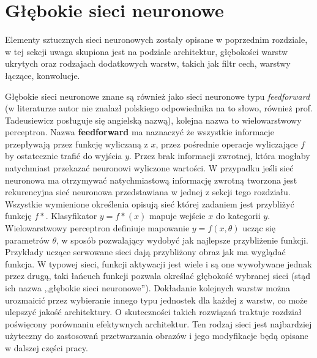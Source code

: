 \documentclass[12pt,a4paper,twoside,titlepage,openright]{book}
\begin{document}
\section{Głębokie sieci neuronowe}
Elementy sztucznych sieci neuronowych zostały opisane w poprzednim rozdziale, w tej sekcji uwaga skupiona jest na podziale architektur, głębokości warstw ukrytych oraz rodzajach dodatkowych warstw, takich jak filtr cech, warstwy łączące, konwolucje.

Głębokie sieci neuronowe znane są również jako sieci neuronowe typu \textit{feedforward} (w literaturze autor nie znalazł polskiego odpowiednika na to słowo, również prof. Tadeusiewicz posługuje się angielską nazwą), kolejna nazwa to wielowarstwowy perceptron. Nazwa \textbf{feedforward} ma naznaczyć że wszystkie informacje przepływają przez funkcję wyliczaną z \(x\), przez pośrednie operacje wyliczające \(f\) by ostatecznie trafić do wyjścia \(y\). Przez brak informacji zwrotnej, która mogłaby natychmiast przekazać neuronowi wyliczone wartości. W przypadku jeśli sieć neuronowa ma otrzymywać natychmiastową informację zwrotną tworzona jest rekurencyjna sieć neuronowa przedstawiana w jednej z sekcji tego rozdziału. Wszystkie wymienione określenia opisują sieć której zadaniem jest przybliżyć funkcję \(f*\). Klasyfikator \(y = f*(x) \) mapuje wejście \(x\) do kategorii \(y\). Wielowarstwowy perceptron definiuje mapowanie \(y = f(x,\theta)\) ucząc się parametrów \(\theta\), w sposób pozwalający wydobyć jak najlepsze przybliżenie funkcji. Przykłady uczące serwowane sieci dają przybliżony obraz jak ma wyglądać funkcja. W typowej sieci, funkcji aktywacji jest wiele i są one wywoływane jednak przez drugą, taki łańcuch funkcji pozwala określać głębokość wybranej sieci (stąd ich nazwa ,,głębokie sieci neuronowe''). Dokładanie kolejnych warstw można urozmaicić przez wybieranie innego typu jednostek dla każdej z warstw, co może ulepszyć jakość architektury. O skuteczności takich rozwiązań traktuje rozdział poświęcony porównaniu efektywnych architektur. Ten rodzaj sieci jest najbardziej użyteczny do zastosowań przetwarzania obrazów i jego modyfikacje będą opisane w dalszej części pracy.
\end{document}
